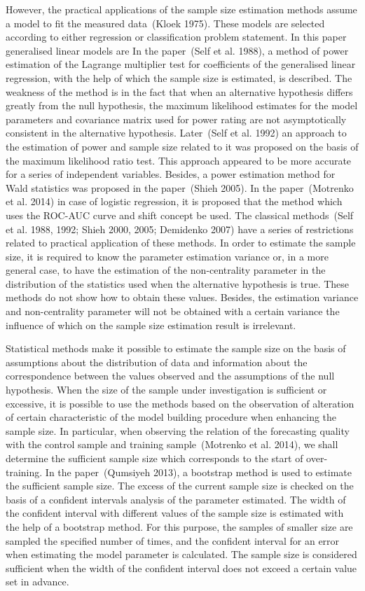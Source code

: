 \documentclass[
11pt,%
tightenlines,%
twoside,%
onecolumn,%
nofloats,%
nobibnotes,%
nofootinbib,%
superscriptaddress,%
noshowpacs,%
centertags]%
{revtex4}
\begin{document}
However, the practical applications of the sample size estimation methods assume a model to fit the measured data~(Kloek 1975). These models are selected according to either regression or classification problem statement. In this paper generalised linear models are  In the paper~(Self et al. 1988), a method of power estimation of the Lagrange multiplier test for coefficients of the generalised linear regression, with the help of which the sample size is estimated, is described. The weakness of the method is in the fact that when an alternative hypothesis differs greatly from the null hypothesis, the maximum likelihood estimates for the model parameters and covariance matrix used for power rating are not asymptotically consistent in the alternative hypothesis. Later~(Self et al. 1992) an approach to the estimation of power and sample size related to it was proposed on the basis of the maximum likelihood ratio test. This approach appeared to be more accurate for a series of independent variables. Besides, a power estimation method for Wald statistics was proposed in the paper~(Shieh 2005). In the paper~(Motrenko et al. 2014) in case of logistic regression, it is proposed that the method which uses the ROC-AUC curve and shift concept be used. The classical methods~(Self et al. 1988, 1992; Shieh 2000, 2005; Demidenko 2007) have a series of restrictions related to practical application of these methods. In order to estimate the sample size, it is required to know the parameter estimation variance or, in a more general case, to have the estimation of the non-centrality parameter in the distribution of the statistics used when the alternative hypothesis is true. These methods do not show how to obtain these values. Besides, the estimation variance and non-centrality parameter will not be obtained with a certain variance the influence of which on the sample size estimation result is irrelevant. 

Statistical methods make it possible to estimate the sample size on the basis of assumptions about the distribution of data and information about the correspondence between the values observed and the assumptions of the null hypothesis. When the size of the sample under investigation is sufficient or excessive, it is possible to use the methods based on the observation of alteration of certain characteristic of the model building procedure when enhancing the sample size. In particular, when observing the relation of the forecasting quality with the control sample and training sample~(Motrenko et al. 2014), we shall determine the sufficient sample size which corresponds to the start of over-training. In the paper~(Qumsiyeh 2013), a bootstrap method is used to estimate the sufficient sample size. The excess of the current sample size is checked on the basis of a confident intervals analysis of the parameter estimated. The width of the confident interval with different values of the sample size is estimated with the help of a bootstrap method. For this purpose, the samples of smaller size are sampled the specified number of times, and the confident interval for an error when estimating the model parameter is calculated. The sample size is considered sufficient when the width of the confident interval does not exceed a certain value set in advance.
\end{document}
